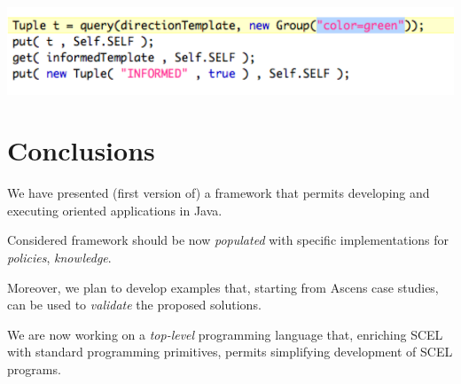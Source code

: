 \documentclass[11pt]{article}
\newcommand{\java}{\textsf{Java}}
\begin{document}
\begin{center}
\includegraphics[scale=0.45]{img/groupcode}
\end{center}


\section{Conclusions} 

We have presented (first version of) a framework that permits developing and
executing \SCEL{} oriented applications in \java{}.

Considered framework should be now \emph{populated} with
specific implementations for \emph{policies}, \emph{knowledge}. 

Moreover, we plan to develop examples that, starting from Ascens case studies, can be used to \emph{validate}
the proposed solutions.

We are now working on a \emph{top-level} programming language that, enriching SCEL
with standard programming primitives, permits simplifying development of SCEL programs.



\end{document}
